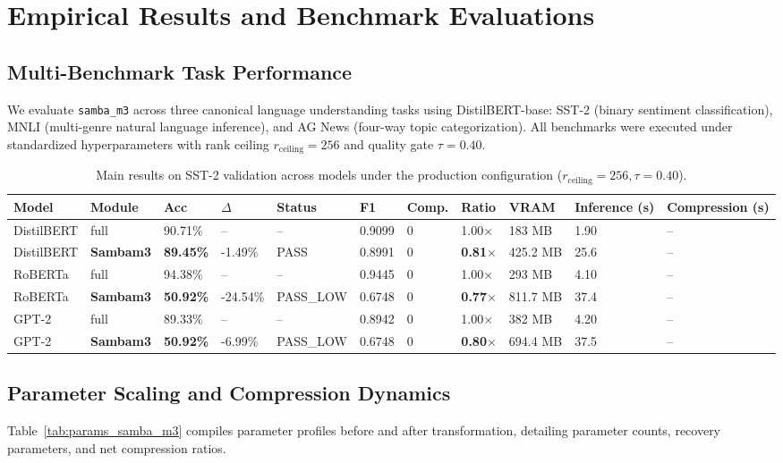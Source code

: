 \section{Empirical Results and Benchmark Evaluations}
\label{sec:results}

\subsection{Multi-Benchmark Task Performance}
We evaluate \texttt{samba\_m3} across three canonical language understanding tasks using DistilBERT-base: SST-2 (binary sentiment classification), MNLI (multi-genre natural language inference), and AG News (four-way topic categorization). All benchmarks were executed under standardized hyperparameters with rank ceiling $r_{\mathrm{ceiling}} = 256$ and quality gate $\tau = 0.40$.

\begin{table}[t]
\centering
\small
\begin{tabular}{lllllllllll}
\toprule
\textbf{Model} & \textbf{Module} & \textbf{Acc} & \textbf{$\Delta$} & \textbf{Status} & \textbf{F1} & \textbf{Comp.} & \textbf{Ratio} & \textbf{VRAM} & \textbf{Inference (s)} & \textbf{Compression (s)} \\
\midrule
DistilBERT & full & 90.71\% & -- & -- & 0.9099 & 0 & 1.00$\times$ & 183 MB & 1.90 & -- \\
DistilBERT & \textbf{Sambam3} & \textbf{89.45\%} & -1.49\% & PASS & 0.8991 & 0 & \textbf{0.81$\times$} & 425.2 MB & 25.6 & -- \\
RoBERTa & full & 94.38\% & -- & -- & 0.9445 & 0 & 1.00$\times$ & 293 MB & 4.10 & -- \\
RoBERTa & \textbf{Sambam3} & \textbf{50.92\%} & -24.54\% & PASS_LOW & 0.6748 & 0 & \textbf{0.77$\times$} & 811.7 MB & 37.4 & -- \\
GPT-2 & full & 89.33\% & -- & -- & 0.8942 & 0 & 1.00$\times$ & 382 MB & 4.20 & -- \\
GPT-2 & \textbf{Sambam3} & \textbf{50.92\%} & -6.99\% & PASS_LOW & 0.6748 & 0 & \textbf{0.80$\times$} & 694.4 MB & 37.5 & -- \\
\bottomrule
\end{tabular}
\caption{Main results on SST-2 validation across models under the production configuration ($r_{\mathrm{ceiling}}=256, \tau=0.40$).}
\label{tab:main_sst2}
\end{table}

\subsection{Parameter Scaling and Compression Dynamics}
Table~\ref{tab:params_samba_m3} compiles parameter profiles before and after transformation, detailing parameter counts, recovery parameters, and net compression ratios.

